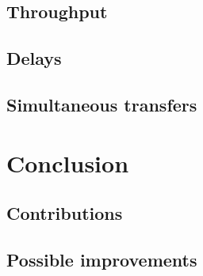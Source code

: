 \documentclass[journal]{IEEEtran}
\begin{document}
\subsection{Throughput}





\subsection{Delays}

\subsection{Simultaneous transfers}






\section{Conclusion}

\subsection{Contributions}


\subsection{Possible improvements}







 

%
\end{document}
